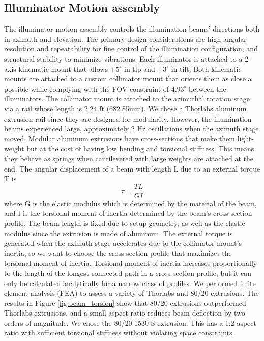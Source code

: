 \subsection{Illuminator Motion assembly}
The illuminator motion assembly controls the illumination beams' directions both in azimuth and elevation. The primary design considerations are high angular resolution and repeatability for fine control of the illumination configuration, and structural stability to minimize vibrations. Each illuminator is attached to a 2-axis kinematic mount that allows $\pm 5^\circ$ in tip and  $\pm 3^\circ$ in tilt. Both kinematic mounts are attached to a custom collimator mount that orients them as close a possible while complying with the FOV constraint of $4.93^\circ$ between the illuminators. The collimator mount is attached to the azimuthal rotation stage via a rail whose length is 2.24 ft (682.85mm). We chose a Thorlabs aluminum extrusion rail since they are designed for modularity. However, the illumination beams experienced large, approximately 2 Hz oscillations when the azimuth stage moved. Modular aluminum extrusions have cross-sections that make them light-weight but at the cost of having low bending and torsional stiffness. This means they behave as springs when cantilevered with large weights are attached at the end. The angular displacement of a beam with length L due to an external torque T is
%
\begin{equation}
    \tau = \frac{TL}{GI}
\end{equation}
%
where G is the elastic modulus which is determined by the material of the beam, and I is the torsional moment of inertia determined by the beam's cross-section profile. The beam length is fixed due to setup geometry, as well as the elastic modulus since the extrusion is made of aluminum. The external torque is generated when the azimuth stage accelerates due to the collimator mount's inertia, so we want to choose the cross-section profile that maximizes the torsional moment of inertia. Torsional moment of inertia increases proportionally to the length of the longest connected path in a cross-section profile, but it can only be calculated analytically for a narrow class of profiles. We performed finite element analysis (FEA) to assess a variety of Thorlabs and 80/20 extrusions. The results in Figure \ref{fig:beam_torsion} show that 80/20 extrusions outperformed Thorlabs extrusions, and a small aspect ratio reduces beam deflection by two orders of magnitude. We chose the 80/20 1530-S extrusion. This has a 1:2 aspect ratio with sufficient torsional stiffness without violating space constraints.
